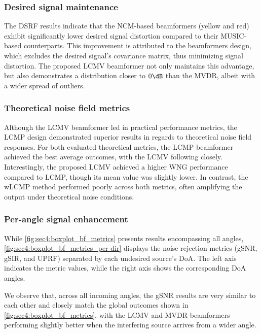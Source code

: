 

\subsubsection*{Desired signal maintenance}

The DSRF results indicate that the NCM-based beamformers (yellow and red) exhibit significantly lower desired signal distortion compared to their MUSIC-based counterparts. This improvement is attributed to the beamformers design, which excludes the desired signal's covariance matrix, thus minimizing signal distortion. The proposed LCMV beamformer not only maintains this advantage, but also demonstrates a distribution closer to $0\dB$ than the MVDR, albeit with a wider spread of outliers.

\subsubsection*{Theoretical noise field metrics}

Although the LCMV beamformer led in practical performance metrics, the LCMP design demonstrated superior results in regards to theoretical noise field responses. For both evaluated theoretical metrics, the LCMP beamformer achieved the best average outcomes, with the LCMV following closely. Interestingly, the proposed LCMV achieved a higher WNG performance compared to LCMP, though its mean value was slightly lower. In contrast, the wLCMP method performed poorly across both metrics, often amplifying the output under theoretical noise conditions.

\subsubsection*{Per-angle signal enhancement}

While \cref{fig:sec4:boxplot_bf_metrics} presents results encompassing all angles, \cref{fig:sec4:boxplot_bf_metrics_per-dir} displays the noise rejection metrics (gSNR, gSIR, and UPRF) separated by each undesired source's DoA. The left axis indicates the metric values, while the right axis shows the corresponding DoA angles.

We observe that, across all incoming angles, the gSNR results are very similar to each other and closely match the global outcomes shown in \cref{fig:sec4:boxplot_bf_metrics}, with the LCMV and MVDR beamformers performing slightly better when the interfering source arrives from a wider angle.

